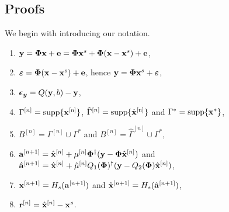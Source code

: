 \documentclass[11pt]{article}
\begin{document}
\subsection{Proofs}
We begin with introducing our notation.
\begin{enumerate}
    \item ${\bf y} = {\bf \Phi} {\bf x} + {\bf e} = {\bf \Phi} {\bf x}^s + {\bf \Phi}({\bf x}-{\bf x}^s) + {\bf e}$,
    \item $\boldsymbol{\varepsilon} = {\bf \Phi}({\bf x}-{\bf x}^s) + {\bf e}$, hence ${\bf y} = {\bf \Phi} {\bf x}^s + \boldsymbol{\varepsilon}$,
    \item $\boldsymbol{\epsilon_y} = Q({\bf y},b) - {\bf y}$,
    \item $\Gamma^{[n]} = \rm{supp}\{{\bf x}^{[n]} \}$, $\hat{\Gamma}^{[n]} = \rm{supp}\{\hat{{\bf x}}^{[n]} \}$ and $\Gamma^{*} = \rm{supp}\{{\bf x}^{*} \}$,
    \item $B^{[n]} = \Gamma^{[n]} \cup \Gamma^{*}$ and $B^{[n]} = \hat{\Gamma}^{[n]} \cup \Gamma^{*}$,
    \item ${\bf a}^{[n+1]} = \hat{{\bf x}}^{[n]} + \mu^{[n]}{\bf \Phi}^{\dag}({\bf y} - {\bf \Phi}\hat{{\bf x}}^{[n]})$ and $\hat{{\bf a}}^{[n+1]} = \hat{{\bf x}}^{[n]} + \hat{\mu}^{[n]}Q_{1}({\bf \Phi})^{\dag}({\bf y} - Q_2({\bf \Phi})\hat{{\bf x}}^{[n]})$,
    \item ${\bf x}^{[n+1]} = H_s({\bf a}^{[n+1]})$ and $\hat{{\bf x}}^{[n+1]} = H_s(\hat{{\bf a}}^{[n+1]})$,
    \item ${\bf r}^{[n]} = \hat{{\bf x}}^{[n]}-{\bf x}^s$.
\end{enumerate}
\end{document}

